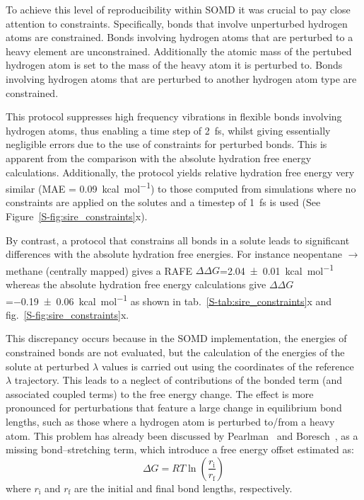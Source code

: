 \documentclass[journal=jctcce,manuscript=article]{achemso}
\begin{document}
To achieve this level of reproducibility within SOMD it was crucial to pay close
attention to constraints. Specifically, bonds that involve unperturbed 
hydrogen atoms are constrained. Bonds involving hydrogen atoms that are 
perturbed to a heavy element are unconstrained.  Additionally the atomic mass 
of the pertubed hydrogen atom is set to the mass of the heavy atom it is 
perturbed to.  Bonds involving hydrogen atoms that are perturbed to another 
hydrogen atom type are constrained. 

This protocol suppresses high frequency vibrations in flexible bonds involving 
hydrogen atoms, thus enabling a time 
step of \SI{2}{fs}, whilst giving essentially negligible errors due to the use 
of constraints for perturbed bonds.  This is apparent from the comparison with 
the absolute hydration free energy calculations.  Additionally, the protocol 
yields relative hydration free energy very similar  (MAE = 
\SI{0.09}{kcal.mol^{-1}}) to those computed from simulations where no
constraints are applied on the solutes and a timestep of \SI{1}{fs} is
used (See Figure~\ref{S-fig:sire_constraints}x).

By contrast, a protocol that constrains all bonds in a solute leads to 
significant differences with the absolute hydration free energies. For instance 
neopentane $\rightarrow$ methane (centrally mapped) gives a RAFE
$\Delta\Delta G$=\SI{2.04 +- 0.01}{kcal.mol^{-1}}  whereas the absolute 
hydration free energy calculations give $\Delta\Delta 
G$=\SI{-0.19+-0.06}{kcal.mol^{-1}} as shown in 
tab.~\ref{S-tab:sire_constraints}x and fig.~\ref{S-fig:sire_constraints}x.

This discrepancy occurs because in the SOMD implementation, the energies of 
constrained bonds are not evaluated, but the calculation of the energies of the 
solute at perturbed $\lambda$ values is carried out using the coordinates of 
the reference $\lambda$ trajectory. This leads to a neglect of contributions of 
the bonded term (and associated coupled terms) to the free energy change. The 
effect is more pronounced for perturbations that feature a large change in 
equilibrium bond lengths, such as those where a hydrogen atom is perturbed 
to/from a heavy atom. This problem has already been discussed by Pearlman~\cite{pearlman1991overlooked} and Boresch~\cite{doi:10.1021/jp981628n, doi:10.1021/jp981629f}, as a missing bond--stretching term, which introduce a free energy offset estimated as:
\begin{equation}
 \label{eq:allbondserror}
 \Delta G= RT\ln \left ( \frac{r_{\mathrm{i}}}{r_\mathrm{f}} \right)
\end{equation}
where $r_{\mathrm{i}}$ and $r_{\mathrm{f}}$ are the initial and final bond 
lengths, respectively. 
\end{document}
